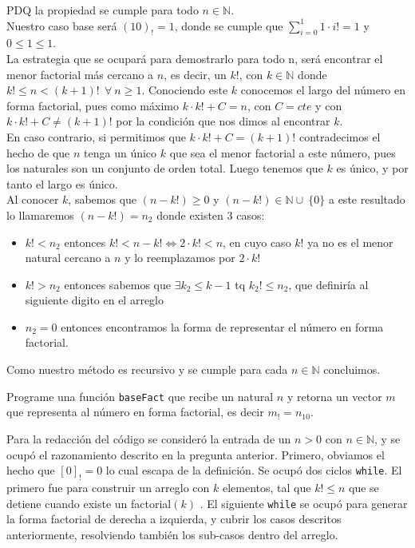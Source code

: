 \documentclass[letterpaper,10pt]{article}
\begin{document}
PDQ la propiedad se cumple para todo $n \in \mathbb{N}$. 
\\

Nuestro caso base será $(10)_{!}=1$, donde se cumple que $\sum_{i=0}^{1} 1\cdot i! = 1 $ y $0 \leqslant 1 \leqslant 1 $. 
\\

La estrategia que se ocupará para demostrarlo para todo n, será encontrar el menor factorial más cercano a $n$, es decir, un $k!$, con $k \in \mathbb{N} $ donde $k!\leqslant n < (k+1)!\ \ \forall\ n \geqslant 1 $. Conociendo este $k$ conocemos el largo del número en forma factorial, pues como máximo $k \cdot k! + C = n$, con $C=cte$ y con $k \cdot k! + C \neq (k+1)! $ por la condición que nos dimos al encontrar $k$.
\\

En caso contrario, si permitimos que $k \cdot k! + C = (k+1)!$ contradecimos el hecho de que $n$ tenga un único $k$ que sea el menor factorial a este número, pues los naturales son un conjunto de orden total. Luego tenemos que $k$ es único, y por tanto el largo es único. 
\\

Al conocer $k$, sabemos que $(n-k!) \geqslant 0$ y $(n-k!) \in \mathbb{N} \cup\ \{0\} $ a este resultado lo llamaremos $(n-k!) =n_2 $ donde existen 3 casos:
\begin{itemize}
\item $k! < n_2 $ entonces $k! < n-k! \Leftrightarrow 2\cdot k! < n $, en cuyo caso $k!$ ya no es el menor natural cercano a $n$ y lo reemplazamos por $2\cdot k!$
\item $k! > n_2 $ entonces sabemos que $\exists k_2\leqslant k-1 $ tq $k_2!\leqslant n_2 $, que definiría al siguiente digito en el arreglo 
\item $ n_2 = 0 $ entonces encontramos la forma de representar el número en forma factorial.
\end{itemize}

Como nuestro método es recursivo y se cumple para cada $n \in \mathbb{N}$ concluimos.\\

\begin{tcolorbox}
 Programe una función \texttt{baseFact} que recibe un natural $n$ y retorna un vector $m$ que representa al número en forma factorial, es decir $m_!=n_{10}$.
\end{tcolorbox}

Para la redacción del código se consideró la entrada de un $n>0$ con $n \in \mathbb{N}$, y se ocupó el razonamiento descrito en la pregunta anterior. Primero, obviamos el hecho que $[0]_{!} = 0$ lo cual escapa de la definición. Se ocupó dos ciclos \texttt{while}. El primero fue para construir un arreglo con $k$ elementos, tal que $k!\leq n$ que se detiene cuando existe un factorial$(k)$ . El siguiente \texttt{while} se ocupó para generar la forma factorial de derecha a izquierda, y cubrir los casos descritos anteriormente, resolviendo también los sub-casos dentro del arreglo.\\
\end{document}
